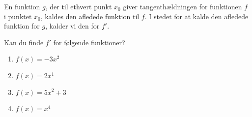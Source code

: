 En funktion $g$, der til ethvert punkt $x_0$ giver tangenthældningen for funktionen $f$ i punktet $x_0$, kaldes den afledede funktion til $f$. I stedet for at kalde den afledede funktion for $g$, kalder vi den for $f'$. 

Kan du finde $f'$ for følgende funktioner?

\begin{enumerate}[label=\roman*)]
	\item $f(x) = -3x^2$
	\item $f(x) = 2x^1$
	\item $f(x) = 5x^2 + 3$
	\item $f(x) = x^4$
\end{enumerate}
